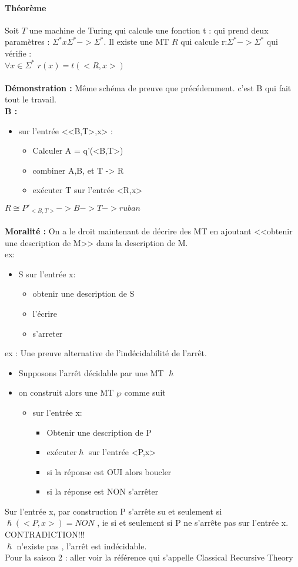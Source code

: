 \documentclass{article}
\begin{document}
{{\paragraph{Théorème } Soit $T$ une machine de Turing qui calcule une fonction t : qui prend deux paramètres  : $\Sigma^*x\Sigma^*->\Sigma^*$. Il existe une MT $R$ qui calcule r:$\Sigma^*->\Sigma^*$ qui vérifie :\\\indent$\forall x\in \Sigma^*$ $r(x) = t(<R,x>)$\\\\\indent\textbf{Démonstration : } Même schéma de preuve que précédemment. c'est B qui fait tout le travail.\\\indent\textbf{B :}\begin{itemize}
\item sur l'entrée <<B,T>,x> : 
\begin{itemize}
\item Calculer A = q'(<B,T>)
\item combiner A,B, et T -> R
\item exécuter T sur l'entrée <R,x>
\end{itemize}
\end{itemize} 
$R \cong P'_{<B,T>} -> B -> T -> ruban$ \\\\\indent\textbf{Moralité : }On a le droit maintenant de décrire des MT en ajoutant <<obtenir une description de M>> dans la description de M.\\ex:\begin{itemize}
\item S sur l'entrée x:
\begin{itemize}
\item obtenir une description de S
\item l'écrire
\item s'arreter
\end{itemize}
\end{itemize}
ex : Une preuve alternative de l'indécidabilité de l’arrêt.
\begin{itemize}
\item Supposons l’arrêt décidable par une MT $\hslash$
\item on construit alors une MT $\wp$ comme suit
\begin{itemize}
\item sur l'entrée x:
\begin{itemize}
\item Obtenir une description de P
\item exécuter$ \hslash$ sur l'entrée <P,x>
\item si la réponse est OUI alors boucler
\item si la réponse est NON s’arrêter
\end{itemize}
\end{itemize}
\end{itemize}
Sur l'entrée x, par construction P s’arrête su et seulement si $\hslash(<P,x>)=NON$ , ie si et seulement si P ne s’arrête pas sur l'entrée x. CONTRADICTION!!!\\$\hslash$ n'existe pas , l’arrêt est indécidable.\\\indent Pour la saison 2 : aller voir la référence qui s'appelle Classical Recursive Theory
\newpage
}}
\end{document}
